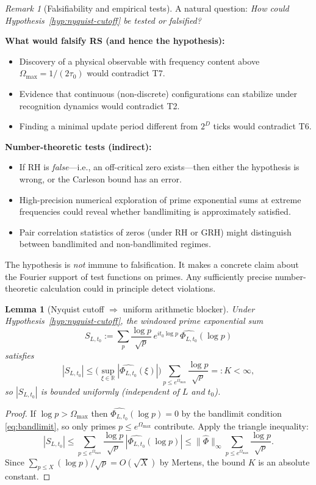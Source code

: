 \documentclass[11pt]{article}
\newtheorem{lemma}[theorem]{Lemma}
\theoremstyle{definition}
\theoremstyle{remark}
\newtheorem{remark}[theorem]{Remark}
\theoremstyle{definition}
\begin{document}
\begin{remark}[Falsifiability and empirical tests]\label{rem:falsifiability}
A natural question: \emph{How could Hypothesis~\ref{hyp:nyquist-cutoff} be tested or falsified?}

\textbf{What would falsify RS (and hence the hypothesis):}
\begin{itemize}
\item Discovery of a physical observable with frequency content above $\Omega_{\max} = 1/(2\tau_0)$ would contradict T7.
\item Evidence that continuous (non-discrete) configurations can stabilize under recognition dynamics would contradict T2.
\item Finding a minimal update period different from $2^D$ ticks would contradict T6.
\end{itemize}

\textbf{Number-theoretic tests (indirect):}
\begin{itemize}
\item If RH is \emph{false}---i.e., an off-critical zero exists---then either the hypothesis is wrong, or the Carleson bound has an error.
\item High-precision numerical exploration of prime exponential sums at extreme frequencies could reveal whether bandlimiting is approximately satisfied.
\item Pair correlation statistics of zeros (under RH or GRH) might distinguish between bandlimited and non-bandlimited regimes.
\end{itemize}

The hypothesis is \emph{not} immune to falsification. It makes a concrete claim about the Fourier support of test functions on primes. Any sufficiently precise number-theoretic calculation could in principle detect violations.
\end{remark}


\begin{lemma}[Nyquist cutoff $\Rightarrow$ uniform arithmetic blocker]\label{lem:nyquist-implies-blocker}
Under Hypothesis~\ref{hyp:nyquist-cutoff}, the windowed prime exponential sum
\[
  S_{L,t_0} := \sum_{p} \frac{\log p}{\sqrt{p}}\,e^{it_0 \log p}\,\widehat{\Phi_{L,t_0}}(\log p)
\]
satisfies
\[
  |S_{L,t_0}| \le \Big(\sup_{\xi \in \mathbb{R}} |\widehat{\Phi_{L,t_0}}(\xi)|\Big) \sum_{p \le e^{\Omega_{\max}}} \frac{\log p}{\sqrt{p}} =: K < \infty,
\]
so $|S_{L,t_0}|$ is bounded uniformly (independent of $L$ and $t_0$).
\end{lemma}
\begin{proof}
If $\log p > \Omega_{\max}$ then $\widehat{\Phi_{L,t_0}}(\log p) = 0$ by the bandlimit condition \eqref{eq:bandlimit}, so only primes $p \le e^{\Omega_{\max}}$ contribute. Apply the triangle inequality:
\[
  |S_{L,t_0}| \le \sum_{p \le e^{\Omega_{\max}}} \frac{\log p}{\sqrt{p}}\,|\widehat{\Phi_{L,t_0}}(\log p)| \le \|\widehat{\Phi}\|_\infty \sum_{p \le e^{\Omega_{\max}}} \frac{\log p}{\sqrt{p}}.
\]
Since $\sum_{p \le X} (\log p)/\sqrt{p} = O(\sqrt{X})$ by Mertens, the bound $K$ is an absolute constant.
\end{proof}
\end{document}
